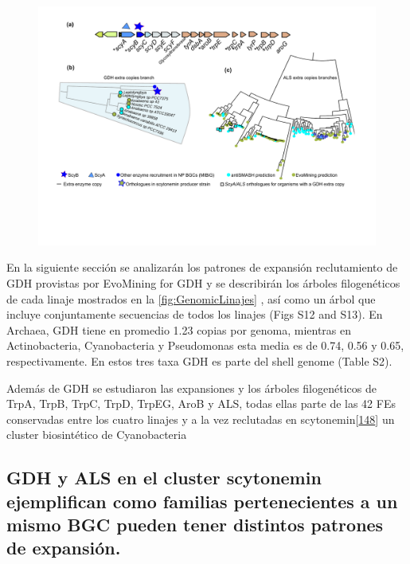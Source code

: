 \documentclass[12pt,twoside]{reedthesis}
\begin{document}
  \begin{figure}[h!tbp]
  \centering
  \includegraphics[angle = 0,scale = .6]{chapter2/FigurasPaper/Figure5.pdf}
  \caption[EvoMining aplicado a la rama de scytonemina]{\footnotesize{}}
  \label{fig:Scytonemin}
  \end{figure}
  
  En la siguiente sección se analizarán los patrones de expansión
  reclutamiento de GDH provistas por EvoMining for GDH y se describirán
  los árboles filogenéticos de cada linaje mostrados en la
  \autoref{fig:GenomicLinajes} , así como un árbol que incluye
  conjuntamente secuencias de todos los linajes (Figs S12 and S13). En
  Archaea, GDH tiene en promedio 1.23 copias por genoma, mientras en
  Actinobacteria, Cyanobacteria y Pseudomonas esta media es de 0.74, 0.56
  y 0.65, respectivamente. En estos tres taxa GDH es parte del shell
  genome (Table S2).
  
  Además de GDH se estudiaron las expansiones y los árboles filogenéticos
  de TrpA, TrpB, TrpC, TrpD, TrpEG, AroB y ALS, todas ellas parte de las
  42 FEs conservadas entre los cuatro linajes y a la vez reclutadas en
  scytonemin{[}\protect\hyperlink{ref-balskus_investigating_2008}{148}{]}
  un cluster biosintético de Cyanobacteria
  
  \subsection{GDH y ALS en el cluster scytonemin ejemplifican como
  familias pertenecientes a un mismo BGC pueden tener distintos patrones
  de
  expansión.}\label{gdh-y-als-en-el-cluster-scytonemin-ejemplifican-como-familias-pertenecientes-a-un-mismo-bgc-pueden-tener-distintos-patrones-de-expansion.}
  
\end{document}
